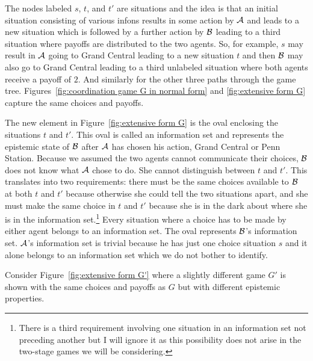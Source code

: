 The nodes labeled $s$, $t$, and $t'$ are situations and the idea is that an initial situation consisting of various infons results in some action by $\cal A$ and leads to a new situation which is followed by a further action by $\cal B$ leading to a third situation where payoffs are distributed to the two agents. So, for example, $s$ may result in $\cal A$ going to Grand Central leading to a new situation $t$ and then $\cal B$ may also go to Grand Central leading to a third unlabeled situation where both agents receive a payoff of $2$. And similarly for the other three paths through the game tree. Figures~\ref{fig:coordination game G in normal form} and \ref{fig:extensive form G} capture the same choices and payoffs.

The new element in Figure~\ref{fig:extensive form G} is the oval enclosing the situations $t$ and $t'$. This oval is called an information set and represents the epistemic state of $\cal B$ after $\cal A$ has chosen his action, Grand Central or Penn Station. Because we assumed the two agents cannot communicate their choices, $\cal B$ does not know what $\cal A$ chose to do. She cannot distinguish between $t$ and $t'$. This translates into two requirements: there must be the same choices available to $\cal B$ at both $t$ and $t'$ because otherwise she could tell the two situations apart, and she must make the same choice in $t$ and $t'$ because she is in the dark about where she is in the information set.\footnote{There is a third requirement involving one situation in an information set not preceding another but I will ignore it as this possibility does not arise in the two-stage games we will be considering.} Every situation where a choice has to be made by either agent belongs to an information set. The oval represents $\cal B$'s information set. $\cal A$'s information set is trivial because he has just one choice situation $s$ and it alone belongs to an information set which we do not bother to identify. 

Consider Figure~\ref{fig:extensive form G'} where a slightly different game $G'$ is shown with the same choices and payoffs as $G$ but with different epistemic properties.

